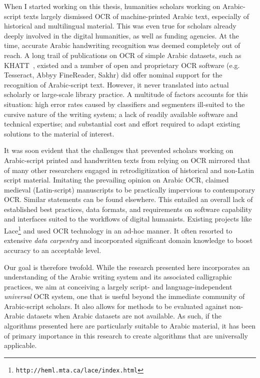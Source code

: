 When I started working on this thesis, humanities scholars working on
Arabic-script texts largely dismissed OCR of machine-printed Arabic text,
especially of historical and multilingual material. This was even true for
scholars already deeply involved in the digital humanities, as well as funding
agencies. At the time, accurate Arabic handwriting recognition was deemed
completely out of reach. A long trail of publications on OCR of simple Arabic
datasets, such as KHATT~\cite{mahmoud2014khatt}, existed and a number of open
and proprietary OCR software (e.g. Tesseract, Abbyy FineReader, Sakhr) did
offer nominal support for the recognition of Arabic-script text.  However, it
never translated into actual scholarly or large-scale library practice. A
multitude of factors accounts for this situation: high error rates caused by
classifiers and segmenters ill-suited to the cursive nature of the writing
system; a lack of readily available software and technical expertise; and
substantial cost and effort required to adapt existing solutions to the
material of interest.

It was soon evident that the challenges that prevented scholars working on
Arabic-script printed and handwritten texts from relying on OCR
mirrored that of many other researchers engaged in retrodigitization of
historical and non-Latin script material. Imitating the prevailing opinion on
Arabic OCR, \cite{widner2017toward} claimed medieval (Latin-script) manuscripts
to be practically impervious to contemporary OCR. Similar statements can be
found elsewhere. This entailed an overall lack of established best practices,
data formats, and requirements on software capability and interfaces suited to
the workflows of digital humanists. Existing projects like
Lace\footnote{\texttt{http://heml.mta.ca/lace/index.html}} and
\cite{alpert2016machine} used OCR technology in an ad-hoc manner. It often
resorted to extensive \emph{data carpentry}\cite{carpentry} and incorporated
significant domain knowledge to boost accuracy to an acceptable level.

Our goal is therefore twofold. While the research presented here incorporates
an understanding of the Arabic writing system and its associated calligraphic
practices, we aim at conceiving a largely script- and language-independent
\emph{universal} OCR system, one that is useful beyond the immediate community
of Arabic-script scholars. It also allows for methods to be evaluated against
non-Arabic datasets when Arabic datasets are not available. As such, if the
algorithms presented here are particularly suitable to Arabic material, it has
been of primary importance in this research to create algorithms that are
universally applicable.

